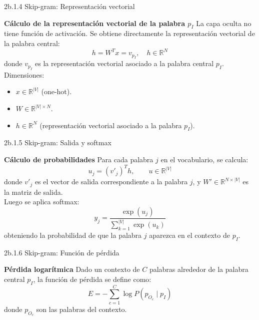 \documentclass{beamer}
\begin{document}
\begin{frame}[fragile]{2b.1.4 Skip-gram: Representación vectorial}
	\begin{block}{\textbf{Cálculo de la representación vectorial de la palabra $p_I$}}
		\justifying
		La capa oculta no tiene función de activación. 
		Se obtiene directamente la representación vectorial de la palabra central:
		\[
		h = W^T x = v_{p_I}, \quad h \in \mathbb{R}^N
		\]
		donde $v_{p_I}$ es la representación vectorial asociado a la palabra central $p_I$.\\
		\vspace{0.2cm}
		Dimensiones:
		\begin{itemize}
			\item $x \in \mathbb{R}^{|V|}$ (one-hot).
			\item $W \in \mathbb{R}^{|V| \times N}$.
			\item $h \in \mathbb{R}^N$ (representación vectorial asociado a la palabra $p_I$).
		\end{itemize}
	\end{block}
\end{frame}

\begin{frame}[fragile]{2b.1.5 Skip-gram: Salida y softmax}
	\begin{block}{\textbf{Cálculo de probabilidades}}
		\justifying
		Para cada palabra $j$ en el vocabulario, se calcula:
		\[
		u_j = (v'_j)^T h, \qquad u \in \mathbb{R}^{|V|}
		\]
		donde $v'_j$ es el vector de salida correspondiente a la palabra $j$, 
		y $W' \in \mathbb{R}^{N \times |V|}$ es la matriz de salida.\\
		\vspace{0.2cm}
		Luego se aplica softmax:
		\[
		y_j = \frac{\exp(u_j)}{\sum_{k=1}^{|V|} \exp(u_k)}
		\]
		obteniendo la probabilidad de que la palabra $j$ aparezca en el contexto de $p_I$.
	\end{block}
\end{frame}

\begin{frame}[fragile]{2b.1.6 Skip-gram: Función de pérdida}
	\begin{block}{\textbf{Pérdida logarítmica}}
		\justifying
		Dado un contexto de $C$ palabras alrededor de la palabra central $p_I$, 
		la función de pérdida se define como:
		\[
		E = - \sum_{c=1}^{C} \log P(p_{O_c} \mid p_I)
		\]
		donde $p_{O_c}$ son las palabras del contexto.\\
		\vspace{0.2cm}
	\end{block}
\end{frame}
\end{document}
